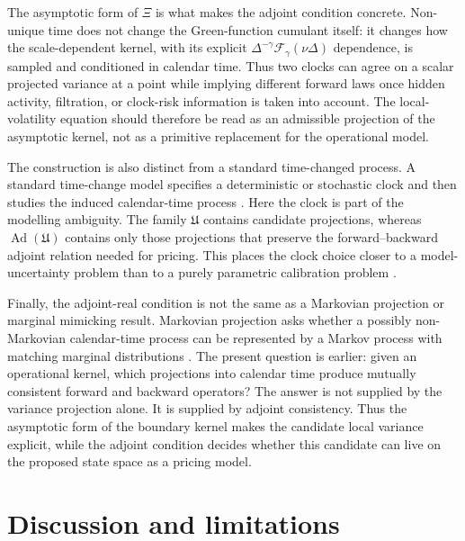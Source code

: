 \documentclass[11pt]{amsart}
\newcommand{\Fcal}{\mathcal{F}}
\newcommand{\Xiop}{\Xi}
\newcommand{\Ad}{\operatorname{Ad}}
\theoremstyle{definition}
\theoremstyle{plain}
\theoremstyle{remark}
\begin{document}
The asymptotic form of $\Xiop$ is what makes the adjoint condition concrete. Non-unique time does not change the Green-function cumulant itself: it changes how the scale-dependent kernel, with its explicit $\Delta^{-\gamma}\Fcal_\gamma(\nu\Delta)$ dependence, is sampled and conditioned in calendar time. Thus two clocks can agree on a scalar projected variance at a point while implying different forward laws once hidden activity, filtration, or clock-risk information is taken into account. The local-volatility equation should therefore be read as an admissible projection of the asymptotic kernel, not as a primitive replacement for the operational model.

The construction is also distinct from a standard time-changed process. A standard time-change model specifies a deterministic or stochastic clock and then studies the induced calendar-time process \cite{Bochner1949,Clark1973,CarrWu2004}. Here the clock is part of the modelling ambiguity. The family $\mathfrak U$ contains candidate projections, whereas $\Ad(\mathfrak U)$ contains only those projections that preserve the forward--backward adjoint relation needed for pricing. This places the clock choice closer to a model-uncertainty problem than to a purely parametric calibration problem \cite{DenisMartini2006,Cont2006}.

Finally, the adjoint-real condition is not the same as a Markovian projection or marginal mimicking result. Markovian projection asks whether a possibly non-Markovian calendar-time process can be represented by a Markov process with matching marginal distributions \cite{Gyongy1986,BrunickShreve2013}. The present question is earlier: given an operational kernel, which projections into calendar time produce mutually consistent forward and backward operators? The answer is not supplied by the variance projection alone. It is supplied by adjoint consistency. Thus the asymptotic form of the boundary kernel makes the candidate local variance explicit, while the adjoint condition decides whether this candidate can live on the proposed state space as a pricing model.

\section{Discussion and limitations}
\end{document}
